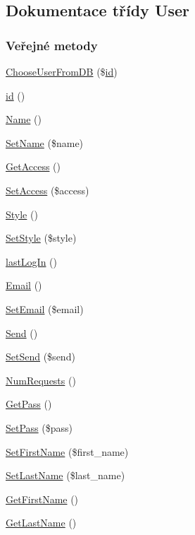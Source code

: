 \hypertarget{class_user}{\subsection{Dokumentace třídy User}
\label{class_user}
}
\subsubsection*{Veřejné metody}
\begin{DoxyCompactItemize}
\item 
\hyperlink{class_user_a337d1fe035dbd184562ac81fa444d4ef}{Choose\-User\-From\-D\-B} (\$\hyperlink{class_user_a3b60cda66c09c25304f49d6c4230271d}{id})
\item 
\hyperlink{class_user_a3b60cda66c09c25304f49d6c4230271d}{id} ()
\item 
\hyperlink{class_user_a4881d658c9c61c99b07263a0c7bb0d80}{Name} ()
\item 
\hyperlink{class_user_a658b940903128d656dea1e1079d8feb6}{Set\-Name} (\$name)
\item 
\hyperlink{class_user_a9b93918071d20f2af7eef938bd7557b2}{Get\-Access} ()
\item 
\hyperlink{class_user_ac559ca879acc5de577ec19f94a890616}{Set\-Access} (\$access)
\item 
\hyperlink{class_user_afdd5770f1fe0ce58b755388694848c97}{Style} ()
\item 
\hyperlink{class_user_adf98bcb613babb99a03caca11a6108c9}{Set\-Style} (\$style)
\item 
\hyperlink{class_user_aaeedefc9dbb0d445c0e9c641cc8fb661}{last\-Log\-In} ()
\item 
\hyperlink{class_user_a074a9e8f3ee5cc195b1299231d3495e9}{Email} ()
\item 
\hyperlink{class_user_a2c6f6e6d98c2e302fdfe45c594e9a23a}{Set\-Email} (\$email)
\item 
\hyperlink{class_user_a075219e311ed4fb02de026cdfd5e25df}{Send} ()
\item 
\hyperlink{class_user_a13983169735085f68e0e5d3974e4c37b}{Set\-Send} (\$send)
\item 
\hyperlink{class_user_adfb309267352369089a9bf718ebf712e}{Num\-Requests} ()
\item 
\hyperlink{class_user_ab03613e5d648286a99f9ed259977956b}{Get\-Pass} ()
\item 
\hyperlink{class_user_a16e7955d1f74efad1827259672d280f5}{Set\-Pass} (\$pass)
\item 
\hyperlink{class_user_ab6b3f9be436c59fbe9e5df2994161457}{Set\-First\-Name} (\$first\-\_\-name)
\item 
\hyperlink{class_user_ac81b393bdf9f6162ac4e50caf8c376ad}{Set\-Last\-Name} (\$last\-\_\-name)
\item 
\hyperlink{class_user_a7f3280d7c2beb556357aae38cb3d71ad}{Get\-First\-Name} ()
\item 
\hyperlink{class_user_a274c99eea9452b9f29e68b873c5ca0ae}{Get\-Last\-Name} ()
\end{DoxyCompactItemize}


